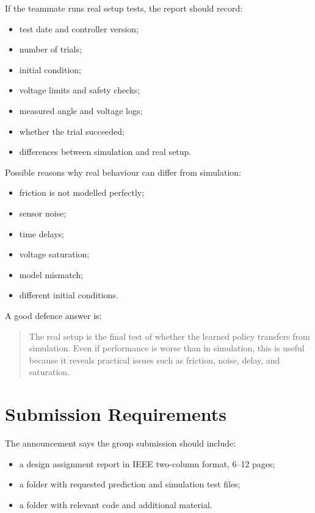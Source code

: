 \documentclass[11pt,a4paper]{article}
\begin{document}
If the teammate runs real setup tests, the report should record:

\begin{itemize}
    \item test date and controller version;
    \item number of trials;
    \item initial condition;
    \item voltage limits and safety checks;
    \item measured angle and voltage logs;
    \item whether the trial succeeded;
    \item differences between simulation and real setup.
\end{itemize}

Possible reasons why real behaviour can differ from simulation:

\begin{itemize}
    \item friction is not modelled perfectly;
    \item sensor noise;
    \item time delays;
    \item voltage saturation;
    \item model mismatch;
    \item different initial conditions.
\end{itemize}

A good defence answer is:

\begin{quote}
The real setup is the final test of whether the learned policy transfers from simulation.
Even if performance is worse than in simulation, this is useful because it reveals practical issues such as friction, noise, delay, and saturation.
\end{quote}

\section{Submission Requirements}

The announcement says the group submission should include:

\begin{itemize}
    \item a design assignment report in IEEE two-column format, 6--12 pages;
    \item a folder with requested prediction and simulation test files;
    \item a folder with relevant code and additional material.
\end{itemize}
\end{document}
